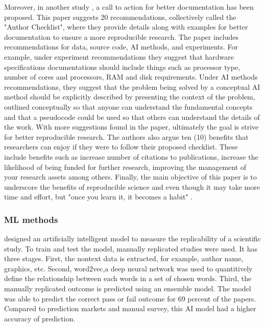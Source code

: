 \documentclass[
10pt, %
a4paper, %
oneside, %
headinclude,footinclude, %
BCOR5mm, %
]{scrartcl}
\begin{document}
Moreover, in another study \cite {Gundersen2019}, a call to action for better documentation has been proposed. This paper suggests 20 recommendations, collectively called the "Author Checklist", 
where they provide details along with examples for better documentation to ensure a more reproducible research. The paper includes recommendations for data, source code, AI methods, and experiments.
For example, under experiment recommendations they suggest that hardware specifications documentations should include things such as processor type, number of cores and processors, RAM and disk requirements. 
Under AI methods recommendations, they suggest that the problem being solved by a conceptual AI method should be explicitly described by presenting the context of the problem, outlined conceptually so that anyone can understand the fundamental
concepts and that a pseudocode could be used so that others can understand the details of the work. With more suggestions found in the paper, ultimately the goal is strive for better reproducible research. The authors also argue ten (10) benefits that researchers can enjoy if they were to follow their 
proposed checklist. These include benefits such as increase number of citations to publications, increase the likelihood of being funded for further research, improving the management of your research assets among others. 
Finally, the main objective of this paper is to underscore the benefits of reproducible science and even though it may take more time and effort, but "once you learn it, it becomes a habit" \cite{Baker2016}.






\subsubsection{ML methods}

\cite{Yang2020} designed an artificially intelligent model to measure the replicability of a scientific study. To train and test the model, manually replicated studies were used. It has three stages. First, the nontext data is extracted, for example, author name, graphics, etc. Second, word2vec,a deep neural network was used to quantitively define the relationship between each words in a set of chosen words. Third, the manually replicated outcome is predicted using an ensemble model. The model was able to predict the correct pass or fail outcome for 69 percent of the papers.	Compared to prediction markets and manual survey, this AI model had a higher accuracy of prediction. 
\end{document}
